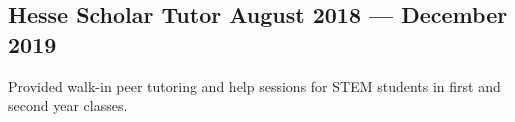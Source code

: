 
\subsection{{Hesse Scholar Tutor \hfill August 2018 --- December 2019}}
\begin{zitemize}
\item Provided walk-in peer tutoring and help sessions for STEM students in first and second year classes.
\end{zitemize}